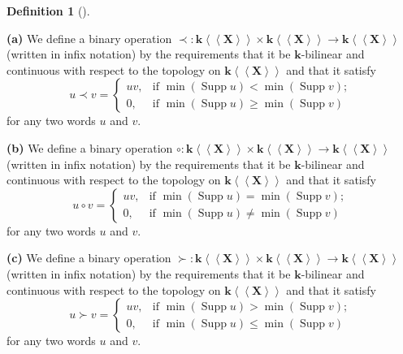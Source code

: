 \documentclass[numbers=enddot,12pt,final,onecolumn,notitlepage,abstracton]{scrartcl}%
\theoremstyle{definition}
\newtheorem{defi}[theo]{Definition}
\newenvironment{definition}[1][]
{\begin{defi}[#1]\begin{leftbar}}
{\end{leftbar}\end{defi}}
\begin{document}
\begin{definition}
\label{def.five-ops}\textbf{(a)} We define a binary operation $\left.
\prec\right.  :\mathbf{k}\left\langle \left\langle \mathbf{X}\right\rangle
\right\rangle \times\mathbf{k}\left\langle \left\langle \mathbf{X}%
\right\rangle \right\rangle \rightarrow\mathbf{k}\left\langle \left\langle
\mathbf{X}\right\rangle \right\rangle $ (written in infix notation) by the
requirements that it be $\mathbf{k}$-bilinear and continuous with respect to
the topology on $\mathbf{k}\left\langle \left\langle \mathbf{X}\right\rangle
\right\rangle $ and that it satisfy%
\[
u\left.  \prec\right.  v=
\begin{cases}
uv, & \text{if }\min\left(  \operatorname*{Supp}u\right)  <\min\left(
\operatorname*{Supp}v\right)  ;\\
0, & \text{if }\min\left(  \operatorname*{Supp}u\right)  \geq\min\left(
\operatorname*{Supp}v\right)
\end{cases}
\]
for any two words $u$ and $v$.

\textbf{(b)} We define a binary operation $\circ:\mathbf{k}\left\langle
\left\langle \mathbf{X}\right\rangle \right\rangle \times\mathbf{k}%
\left\langle \left\langle \mathbf{X}\right\rangle \right\rangle \rightarrow
\mathbf{k}\left\langle \left\langle \mathbf{X}\right\rangle \right\rangle $
(written in infix notation) by the requirements that it be $\mathbf{k}%
$-bilinear and continuous with respect to the topology on $\mathbf{k}%
\left\langle \left\langle \mathbf{X}\right\rangle \right\rangle $ and that it
satisfy%
\[
u\circ v=
\begin{cases}
uv, & \text{if }\min\left(  \operatorname*{Supp}u\right)  =\min\left(
\operatorname*{Supp}v\right)  ;\\
0, & \text{if }\min\left(  \operatorname*{Supp}u\right)  \neq\min\left(
\operatorname*{Supp}v\right)
\end{cases}
\]
for any two words $u$ and $v$.

\textbf{(c)} We define a binary operation $\left.  \succ\right.
:\mathbf{k}\left\langle \left\langle \mathbf{X}\right\rangle \right\rangle
\times\mathbf{k}\left\langle \left\langle \mathbf{X}\right\rangle
\right\rangle \rightarrow\mathbf{k}\left\langle \left\langle \mathbf{X}%
\right\rangle \right\rangle $ (written in infix notation) by the requirements
that it be $\mathbf{k}$-bilinear and continuous with respect to the topology
on $\mathbf{k}\left\langle \left\langle \mathbf{X}\right\rangle \right\rangle
$ and that it satisfy%
\[
u\left.  \succ\right.  v=
\begin{cases}
uv, & \text{if }\min\left(  \operatorname*{Supp}u\right)  >\min\left(
\operatorname*{Supp}v\right)  ;\\
0, & \text{if }\min\left(  \operatorname*{Supp}u\right)  \leq\min\left(
\operatorname*{Supp}v\right)
\end{cases}
\]
for any two words $u$ and $v$.


\end{definition}
\end{document}
